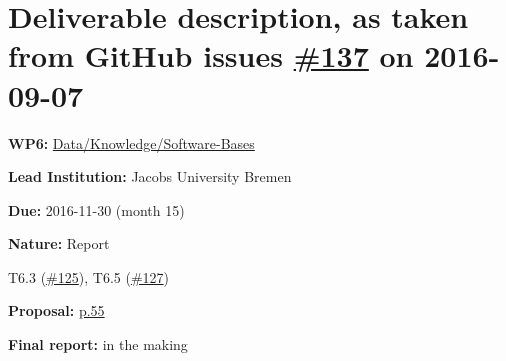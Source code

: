 \section*{\texorpdfstring{Deliverable description, as taken from GitHub issues
    \href{https://github.com/OpenDreamKit/OpenDreamKit/issues/137}{\#137} on
    2016-09-07}{Deliverable description, as taken from GitHub issue \#137 on
    2016-09-07}}\label{deliverable-description-as-taken-from-github-issues-137-on-2016-09-07}
\begin{compactitem}
\tightlist
\item
  \textbf{WP6:}
  \href{https://github.com/OpenDreamKit/OpenDreamKit/tree/master/WP6}{Data/Knowledge/Software-Bases}
\item
  \textbf{Lead Institution:} Jacobs University Bremen
\item
  \textbf{Due:} 2016-11-30 (month 15)
\item
  \textbf{Nature:} Report
\item
  T6.3
  (\href{https://github.com/OpenDreamKit/OpenDreamKit/issues/125}{\#125}),
  T6.5
  (\href{https://github.com/OpenDreamKit/OpenDreamKit/issues/127}{\#127})
\item
  \textbf{Proposal:}
  \href{https://github.com/OpenDreamKit/OpenDreamKit/raw/master/Proposal/proposal-www.pdf}{p.55}
\item
  \textbf{Final report:} in the making
\end{compactitem}

